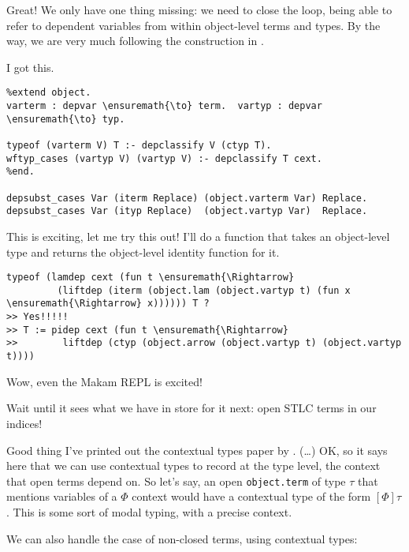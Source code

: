 \heroADVISOR{} Great! We only have one thing missing: we need to close the
loop, being able to refer to dependent variables from within
object-level terms and types. By the way, we are very much following the
construction in \citet{stampoulis2013veriml}.

\heroSTUDENT{} I got this.

\begin{verbatim}
%extend object.
varterm : depvar \ensuremath{\to} term.  vartyp : depvar \ensuremath{\to} typ.

typeof (varterm V) T :- depclassify V (ctyp T).
wftyp_cases (vartyp V) (vartyp V) :- depclassify T cext.
%end.

depsubst_cases Var (iterm Replace) (object.varterm Var) Replace.
depsubst_cases Var (ityp Replace)  (object.vartyp Var)  Replace.
\end{verbatim}

\heroADVISOR{} This is exciting, let me try this out! I'll do a function that
takes an object-level type and returns the object-level identity
function for it.

\begin{verbatim}
typeof (lamdep cext (fun t \ensuremath{\Rightarrow}
         (liftdep (iterm (object.lam (object.vartyp t) (fun x \ensuremath{\Rightarrow} x)))))) T ?
>> Yes!!!!!
>> T := pidep cext (fun t \ensuremath{\Rightarrow}
>>        liftdep (ctyp (object.arrow (object.vartyp t) (object.vartyp t))))
\end{verbatim}

\heroSTUDENT{} Wow, even the Makam REPL is excited!

\heroADVISOR{} Wait until it sees what we have in store for it next: open STLC
terms in our indices!

\heroSTUDENT{} Good thing I've printed out the contextual types paper by
\citet{nanevski2008contextual}. (\ldots{}) OK, so it says here that we
can use contextual types to record at the type level, the context that
open terms depend on. So let's say, an open \texttt{object.term} of type
\(\tau\) that mentions variables of a \(\Phi\) context would have a
contextual type of the form \([\Phi] \tau\). This is some sort of modal
typing, with a precise context.

\heroADVISOR{}

We can also handle the case of non-closed terms, using contextual types:

